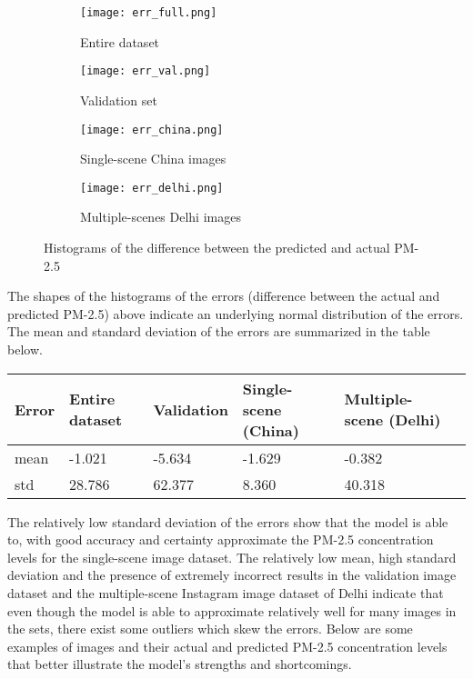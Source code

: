 \documentclass{article}
\begin{document}
\begin{figure}[H]
\centering
\begin{subfigure}{.5\textwidth}
  \centering
  \texttt{[image: err\_full.png]}
  \caption{Entire dataset}
\end{subfigure}%
\begin{subfigure}{.5\textwidth}
  \centering
  \texttt{[image: err\_val.png]}
  \caption{Validation set}
\end{subfigure}

\begin{subfigure}{.5\textwidth}
  \centering
  \texttt{[image: err\_china.png]}
  \caption{Single-scene China images}
\end{subfigure}%
\begin{subfigure}{.5\textwidth}
  \centering
  \texttt{[image: err\_delhi.png]}
  \caption{Multiple-scenes Delhi images}
\end{subfigure}
\caption{Histograms of the difference between the predicted and actual PM-2.5}
\label{Histograms of the difference between the predicted and actual PM-2.5}
\end{figure}
The shapes of the histograms of the errors (difference between the actual and predicted PM-2.5) above indicate an underlying normal distribution of the errors. The mean and standard deviation of the errors are summarized in the table below. 
\begin{table}[H]
\centering
\begin{tabular}{|l|l|l|l|l|l|}
\hline
 Error & Entire dataset & Validation & Single-scene (China) & Multiple-scene (Delhi)\\ \hline
 mean & -1.021 & -5.634 & -1.629 & -0.382 \\ \hline
 std & 28.786 & 62.377 & 8.360 & 40.318 \\ \hline
\end{tabular}
\end{table}
The relatively low standard deviation of the errors show that the model is able to, with good accuracy and certainty approximate the PM-2.5 concentration levels for the single-scene image dataset. The relatively low mean, high standard deviation and the presence of extremely incorrect results in the validation image dataset and the multiple-scene Instagram image dataset of Delhi indicate that even though the model is able to approximate relatively well for many images in the sets, there exist some outliers which skew the errors. Below are some examples of images and their actual and predicted PM-2.5 concentration levels that better illustrate the model's strengths and shortcomings.
\end{document}
